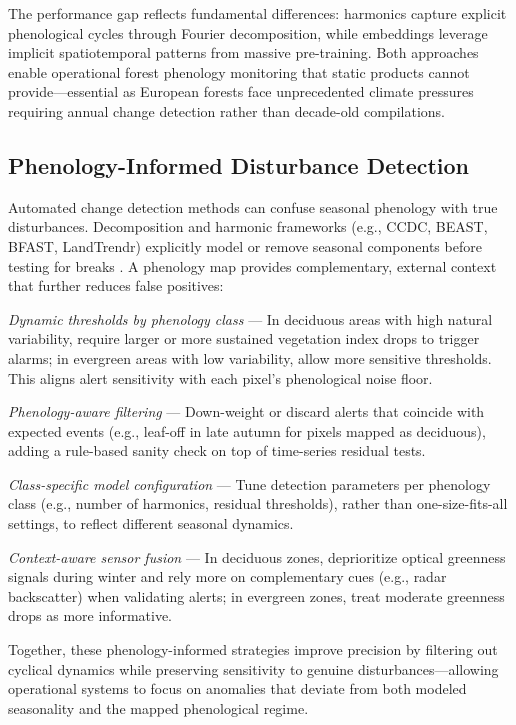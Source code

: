 \documentclass[utf8]{FrontiersinHarvard}
\begin{document}
The performance gap reflects fundamental differences: harmonics capture explicit phenological cycles through Fourier decomposition, while embeddings leverage implicit spatiotemporal patterns from massive pre-training. Both approaches enable operational forest phenology monitoring that static products cannot provide—essential as European forests face unprecedented climate pressures requiring annual change detection rather than decade-old compilations.

\subsection{Phenology-Informed Disturbance Detection}
Automated change detection methods can confuse seasonal phenology with true disturbances. Decomposition and harmonic frameworks (e.g., CCDC, BEAST, BFAST, LandTrendr) explicitly model or remove seasonal components before testing for breaks \citep{Zhu2014,Zhao2019,Verbesselt2010a,Verbesselt2010b,Kennedy2010,Kennedy2018}. A phenology map provides complementary, external context that further reduces false positives:

\textit{Dynamic thresholds by phenology class} — In deciduous areas with high natural variability, require larger or more sustained vegetation index drops to trigger alarms; in evergreen areas with low variability, allow more sensitive thresholds. This aligns alert sensitivity with each pixel’s phenological noise floor.

\textit{Phenology-aware filtering} — Down-weight or discard alerts that coincide with expected events (e.g., leaf-off in late autumn for pixels mapped as deciduous), adding a rule-based sanity check on top of time-series residual tests.

\textit{Class-specific model configuration} — Tune detection parameters per phenology class (e.g., number of harmonics, residual thresholds), rather than one-size-fits-all settings, to reflect different seasonal dynamics.

\textit{Context-aware sensor fusion} — In deciduous zones, deprioritize optical greenness signals during winter and rely more on complementary cues (e.g., radar backscatter) when validating alerts; in evergreen zones, treat moderate greenness drops as more informative.

Together, these phenology-informed strategies improve precision by filtering out cyclical dynamics while preserving sensitivity to genuine disturbances—allowing operational systems to focus on anomalies that deviate from both modeled seasonality and the mapped phenological regime.
\end{document}
